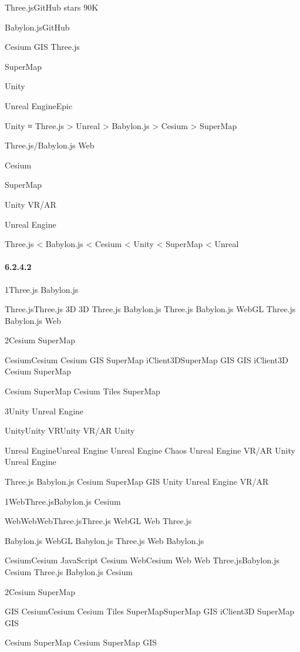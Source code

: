 Three.jsGitHub stars 90K

Babylon.jsGitHub

Cesium GIS Three.js

SuperMap

Unity

Unreal EngineEpic

Unity ≈ Three.js \textgreater{} Unreal \textgreater{} Babylon.js
\textgreater{} Cesium \textgreater{} SuperMap

Three.js/Babylon.js Web

Cesium

SuperMap

Unity VR/AR

Unreal Engine

Three.js \textless{} Babylon.js \textless{} Cesium \textless{} Unity
\textless{} SuperMap \textless{} Unreal

\hypertarget{section-53}{%
\paragraph{6.2.4.2}\label{section-53}}

1Three.js Babylon.js

Three.jsThree.js 3D 3D Three.js Babylon.js Three.js Babylon.js WebGL
Three.js Babylon.js Web

2Cesium SuperMap

CesiumCesium Cesium GIS SuperMap iClient3DSuperMap GIS GIS iClient3D
Cesium SuperMap

Cesium SuperMap Cesium Tiles SuperMap

3Unity Unreal Engine

UnityUnity VRUnity VR/AR Unity

Unreal EngineUnreal Engine Unreal Engine Chaos Unreal Engine VR/AR Unity
Unreal Engine

Three.js Babylon.js Cesium SuperMap GIS Unity Unreal Engine VR/AR

1WebThree.jsBabylon.js Cesium

WebWebWebThree.jsThree.js WebGL Web Three.js

Babylon.js WebGL Babylon.js Three.js Web Babylon.js

CesiumCesium JavaScript Cesium WebCesium Web Web Three.jsBabylon.js
Cesium Three.js Babylon.js Cesium

2Cesium SuperMap

GIS CesiumCesium Cesium Tiles SuperMapSuperMap GIS iClient3D SuperMap
GIS

Cesium SuperMap Cesium SuperMap GIS

